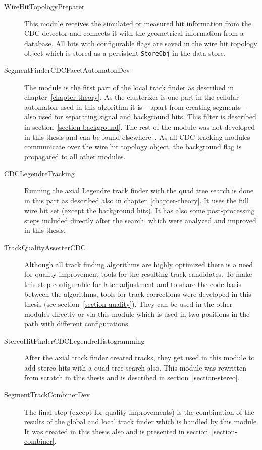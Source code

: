 \begin{description}
  \item[Wire\-Hit\-Topology\-Preparer] This module receives the simulated or measured hit information from the CDC detector and connects it with the geometrical information from a database. All hits with configurable flags are saved in the wire hit topology object which is stored as a persistent \texttt{StoreObj} in the data store.
  \item[Segment\-Finder\-CDC\-Facet\-Automaton\-Dev] The module is the first part of the local track finder as described in chapter~\ref{chapter-theory}. As the clusterizer is one part in the cellular automaton used in this algorithm it is -- apart from creating segments -- also used for separating signal and background hits. This filter is described in section~\ref{section-background}. The rest of the module was not developed in this thesis and can be found elsewhere~\cite{oliver}. As all CDC tracking modules communicate over the wire hit topology object, the background flag is propagated to all other modules.
  \item[CDC\-Legendre\-Tracking] Running the axial Legendre track finder with the quad tree search is done in this part as described also in chapter~\ref{chapter-theory}. It uses the full wire hit set (except the background hits). It has also some post-processing steps included directly after the search, which were analyzed and improved in this thesis. 
  \item[Track\-Quality\-Asserter\-CDC] Although all track finding algorithms are highly optimized there is a need for quality improvement tools for the resulting track candidates. To make this step configurable for later adjustment and to share the code basis between the algorithms, tools for track corrections were developed in this thesis (see section~\ref{section-quality}). They can be used in the other modules directly or via this module which is used in two positions in the path with different configurations.
  \item[Stereo\-Hit\-Finder\-CDC\-Legendre\-Histogramming] After the axial track finder created tracks, they get used in this module to add stereo hits with a quad tree search also. This module was rewritten from scratch in this thesis and is described in section~\ref{section-stereo}.
  \item[Segment\-Track\-Combiner\-Dev] The final step (except for quality improvements) is the combination of the results of the global and local track finder which is handled by this module. It was created in this thesis also and is presented in section~\ref{section-combiner}.
\end{description}

